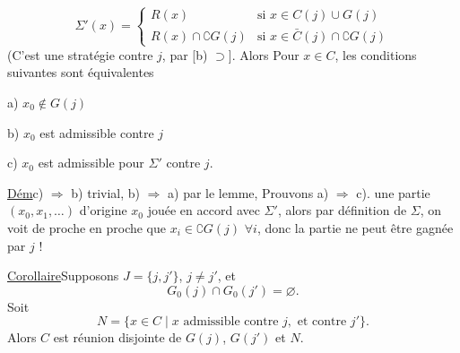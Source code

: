 \[
\Sigma'(x)=\begin{cases}
R(x)&\text{si }x\in C(j)\cup G(j)\\
R(x)\cap\complement G(j)&\text{si }x\in\bar C(j)\cap\complement G(j)
\end{cases}
\]
(C'est une stratégie contre $j$, par [b) $\supset$]. Alors Pour $x\in C$, les conditions suivantes sont équivalentes

a) $x_0\notin G(j)$

b) $x_0$ est admissible contre $j$

c) $x_0$ est admissible pour $\Sigma'$ contre $j$.

\uline{Dém}\quad c) $\Longrightarrow$ b) trivial, b) $\Longrightarrow$ a) par le lemme, Prouvons a) $\Longrightarrow$ c).  une partie $(x_0,x_1,\ldots)$ d'origine $x_0$ jouée en accord avec $\Sigma'$, alors par définition de $\Sigma$, on voit de proche en proche que $x_i\in\complement G(j)$ $\forall i$, donc la partie ne peut être gagnée par $j$ !

\uline{Corollaire}\quad Supposons $J=\{j,j'\}$, $j\ne j'$, et
\margin{$\big|$}
\[
G_0(j)\cap G_0(j')=\varnothing.
\]
Soit 
\[
N=\{x\in C\mid x\text{ admissible contre }j,\text{ et contre }j'\}.
\]
\margin{$\big|$}
Alors $C$ est réunion disjointe de $G(j)$, $G(j')$ et $N$.
